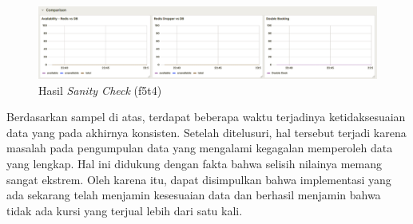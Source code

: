 \begin{figure}[H]
    \centering
    \includegraphics[width=1\textwidth]{resources/chapter-4/sanity-f5t4.png}
    \caption{Hasil \textit{Sanity Check} (f5t4)}
    \label{fig:sanity-f5t4}
\end{figure}

Berdasarkan sampel di atas, terdapat beberapa waktu terjadinya ketidaksesuaian data yang pada akhirnya konsisten. Setelah ditelusuri, hal tersebut terjadi karena masalah pada pengumpulan data yang mengalami kegagalan memperoleh data yang lengkap. Hal ini didukung dengan fakta bahwa selisih nilainya memang sangat ekstrem. Oleh karena itu, dapat disimpulkan bahwa implementasi yang ada sekarang telah menjamin kesesuaian data dan berhasil menjamin bahwa tidak ada kursi yang terjual lebih dari satu kali.
